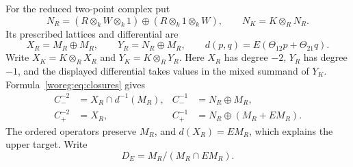 For the reduced two-point complex put
\[
 N_R=(R\otimes_k W\otimes_k1)
       \oplus(R\otimes_k1\otimes_k W),\qquad
 N_K=K\otimes_RN_R.
\]
Its prescribed lattices and differential are
\[
 X_R=M_R\oplus M_R,\qquad Y_R=N_R\oplus M_R,\qquad
 d(p,q)=E(\Theta_{12}p+\Theta_{21}q).
\]
Write \(X_K=K\otimes_RX_R\) and \(Y_K=K\otimes_RY_R\).
Here \(X_R\) has degree \(-2\), \(Y_R\) has degree \(-1\),
and the displayed differential takes values in the mixed summand
of \(Y_K\).  Formula~\eqref{woreg:eq:closures} gives
\begin{align}
 C_-^{-2}&=X_R\cap d^{-1}(M_R),&
 C_-^{-1}&=N_R\oplus M_R,\label{woreg:eq:lower}\\
 C_+^{-2}&=X_R,&
 C_+^{-1}&=N_R\oplus(M_R+EM_R).\label{woreg:eq:upper}
\end{align}
The ordered operators preserve \(M_R\), and
\(d(X_R)=EM_R\), which explains the upper target.
Write
\begin{equation}\label{woreg:eq:defect}
 D_E=M_R/(M_R\cap EM_R).
\end{equation}

